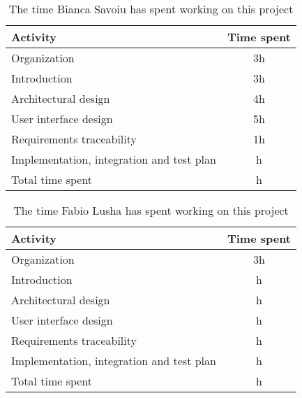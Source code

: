 \label{sec:Effort spent}%
\begin{table}[h!]
    \centering
    \begin{tabular}{|l|c|}
     \hline
     \textbf{Activity} & \textbf{Time spent} \\
    \hline
    Organization & 3h \\
    \hline
    Introduction & 3h \\
    \hline
    Architectural design & 4h \\
    \hline
    User interface design & 5h \\
    \hline
    Requirements traceability & 1h \\
    \hline
    Implementation, integration and test plan & h \\
    \hline
    Total time spent & h \\
    \hline
\end{tabular}
    \caption{The time Bianca Savoiu has spent working on this project}
    \label{tab:Assumptions}
\end{table}


\begin{table}[h!]
    \centering
    \begin{tabular}{|l|c|}
    \hline
     \textbf{Activity} & \textbf{Time spent} \\
     \hline
    Organization & 3h \\
    \hline
    Introduction & h \\
    \hline
    Architectural design & h \\
    \hline
    User interface design & h \\
    \hline
    Requirements traceability & h \\
    \hline
    Implementation, integration and test plan & h \\
    \hline
    Total time spent & h \\
    \hline
\end{tabular}
    \caption{The time Fabio Lusha has spent working on this project}
    \label{tab:Assumptions}
\end{table}